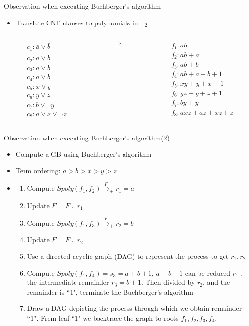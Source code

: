 \documentclass[xcolor=dvipsnames]{beamer}
\newcommand{\bi}{\begin{itemize}}
\newcommand{\ei}{\end{itemize}}
\begin{document}
\begin{frame}{\large{Observation when executing Buchberger's algorithm}}
\bi
\item Translate CNF clauses to polynomials in $\mathbb F_2$
\ei
\begin{columns}[onlytextwidth]
\begin{column}{0.3\textwidth}
\begin{align*}
&c_1: \bar{a}\lor\bar{b}\\
&c_2: a\lor\bar{b}\\
&c_3: \bar{a}\lor b\\
&c_4: a\lor b\\
&c_5: x\lor y\\
&c_6: y\lor z\\
&c_7: b\lor \neg y\\
&c_8: a\lor x\lor \neg z
\end{align*}
\end{column}
\begin{column}{0.3\textwidth}

$$\implies$$
\end{column}
\begin{column}{0.4\textwidth}
\begin{align*}
&f_1:ab\\
&f_2:ab+a\\
&f_3:ab+b\\
&f_4:ab+a+b+1\\
&f_5:xy+y+x+1\\
&f_6:yz+y+z+1\\
&f_7:by+y\\
&f_8:axz+az+xz+z
\end{align*}
\end{column}
\end{columns}
\end{frame}
\begin{frame}{\large{Observation when executing Buchberger's algorithm(2)}}
\bi
\item Compute a GB using Buchberger's algorithm
\item Term ordering: $a>b>x>y>z$
\item
\begin{enumerate}
\item Compute $Spoly(f_1,f_2)\xrightarrow{F}_{+} r_1 = a$
\item Update $F=F\cup r_1$
\item Compute $Spoly(f_1,f_3)\xrightarrow{F}_{+} r_2=b$
\item Update $F=F\cup r_2$
\item Use a directed acyclic graph (DAG) to represent the process to get $r_1,r_2$
\item Compute $Spoly(f_1,f_4) = s_3= a+b+1$, $a+b+1$ can be reduced 
$r_1$ , the intermediate remainder $r_3 = b+1$. Then divided by $r_2$, and the remainder is ``1", 
\alert{terminate the Buchberger's algorithm}
\item Draw a DAG depicting the process through which we obtain remainder ``1". 
From leaf ``1" we backtrace the graph to roots $f_1,f_2,f_3,f_4$. 
\end{enumerate}
\ei
\end{frame}
\end{document}

